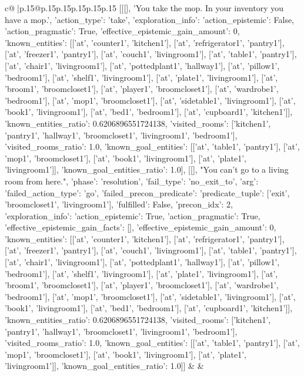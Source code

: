 \documentclass{article}
\begin{document}
{\begin{supertabular}{c@{$\;$}|p{.15\linewidth}@{}p{.15\linewidth}p{.15\linewidth}p{.15\linewidth}p{.15\linewidth}p{.15\linewidth}}
{{{	 [[[], 'You take the mop. In your inventory you have a mop.', {'action_type': 'take', 'exploration_info': {'action_epistemic': False, 'action_pragmatic': True, 'effective_epistemic_gain_amount': 0, 'known_entities': [['at', 'counter1', 'kitchen1'], ['at', 'refrigerator1', 'pantry1'], ['at', 'freezer1', 'pantry1'], ['at', 'couch1', 'livingroom1'], ['at', 'table1', 'pantry1'], ['at', 'chair1', 'livingroom1'], ['at', 'pottedplant1', 'hallway1'], ['at', 'pillow1', 'bedroom1'], ['at', 'shelf1', 'livingroom1'], ['at', 'plate1', 'livingroom1'], ['at', 'broom1', 'broomcloset1'], ['at', 'player1', 'broomcloset1'], ['at', 'wardrobe1', 'bedroom1'], ['at', 'mop1', 'broomcloset1'], ['at', 'sidetable1', 'livingroom1'], ['at', 'book1', 'livingroom1'], ['at', 'bed1', 'bedroom1'], ['at', 'cupboard1', 'kitchen1']], 'known_entities_ratio': 0.6206896551724138, 'visited_rooms': ['kitchen1', 'pantry1', 'hallway1', 'broomcloset1', 'livingroom1', 'bedroom1'], 'visited_rooms_ratio': 1.0, 'known_goal_entities': [['at', 'table1', 'pantry1'], ['at', 'mop1', 'broomcloset1'], ['at', 'book1', 'livingroom1'], ['at', 'plate1', 'livingroom1']], 'known_goal_entities_ratio': 1.0}}], [[], "You can't go to a living room from here.", {'phase': 'resolution', 'fail_type': 'no_exit_to', 'arg': {'failed_action_type': 'go', 'failed_precon_predicate': {'predicate_tuple': ['exit', 'broomcloset1', 'livingroom1'], 'fulfilled': False, 'precon_idx': 2}}, 'exploration_info': {'action_epistemic': True, 'action_pragmatic': True, 'effective_epistemic_gain_facts': [], 'effective_epistemic_gain_amount': 0, 'known_entities': [['at', 'counter1', 'kitchen1'], ['at', 'refrigerator1', 'pantry1'], ['at', 'freezer1', 'pantry1'], ['at', 'couch1', 'livingroom1'], ['at', 'table1', 'pantry1'], ['at', 'chair1', 'livingroom1'], ['at', 'pottedplant1', 'hallway1'], ['at', 'pillow1', 'bedroom1'], ['at', 'shelf1', 'livingroom1'], ['at', 'plate1', 'livingroom1'], ['at', 'broom1', 'broomcloset1'], ['at', 'player1', 'broomcloset1'], ['at', 'wardrobe1', 'bedroom1'], ['at', 'mop1', 'broomcloset1'], ['at', 'sidetable1', 'livingroom1'], ['at', 'book1', 'livingroom1'], ['at', 'bed1', 'bedroom1'], ['at', 'cupboard1', 'kitchen1']], 'known_entities_ratio': 0.6206896551724138, 'visited_rooms': ['kitchen1', 'pantry1', 'hallway1', 'broomcloset1', 'livingroom1', 'bedroom1'], 'visited_rooms_ratio': 1.0, 'known_goal_entities': [['at', 'table1', 'pantry1'], ['at', 'mop1', 'broomcloset1'], ['at', 'book1', 'livingroom1'], ['at', 'plate1', 'livingroom1']], 'known_goal_entities_ratio': 1.0}}]] 
	  } 
	   } 
	   } 
	 & & \\ 
 


\end{supertabular}}
\end{document}
